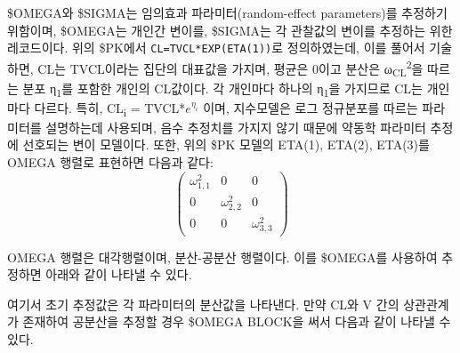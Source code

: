 \documentclass[
  10pt,
  krantz2,
  a4paper]{krantz}
\newenvironment{Shaded}{\begin{snugshade}}{\end{snugshade}}
\newcommand{\DecValTok}[1]{\textcolor[rgb]{0.00,0.00,0.81}{#1}}
\newcommand{\FloatTok}[1]{\textcolor[rgb]{0.00,0.00,0.81}{#1}}
\newcommand{\KeywordTok}[1]{\textcolor[rgb]{0.13,0.29,0.53}{\textbf{#1}}}
\newcommand{\NormalTok}[1]{#1}
\newcommand{\OperatorTok}[1]{\textcolor[rgb]{0.81,0.36,0.00}{\textbf{#1}}}
\newenvironment{Shaded}{\begin{snugshade}}{\end{snugshade}}
\theoremstyle{definition}
\theoremstyle{definition}
\theoremstyle{definition}
\theoremstyle{remark}
\begin{document}
\$OMEGA와 \$SIGMA는 임의효과 파라미터(random-effect parameters)를 추정하기 위함이며, \$OMEGA는 개인간 변이를, \$SIGMA는 각 관찰값의 변이를 추정하는 위한 레코드이다. 위의 \$PK에서 \texttt{CL=TVCL*EXP(ETA(1))}로 정의하였는데, 이를 풀어서 기술하면, CL는 TVCL이라는 집단의 대표값을 가지며, 평균은 0이고 분산은 ω\textsubscript{CL}\textsuperscript{2}을 따르는 분포 η\textsubscript{1}를 포함한 개인의 CL값이다. 각 개인마다 하나의 η\textsubscript{1}을 가지므로 CL는 개인마다 다르다. 특히, CL\textsubscript{i} = TVCL*\(e^{\eta_{i}}\) 이며, 지수모델은 로그 정규분포를 따르는 파라미터를 설명하는데 사용되며, 음수 추정치를 가지지 않기 때문에 약동학 파라미터 추정에 선호되는 변이 모델이다. 또한, 위의 \$PK 모델의 ETA(1), ETA(2), ETA(3)를 OMEGA 행렬로 표현하면 다음과 같다:
\begin{equation}
\begin{pmatrix} 
   \omega_{1,1}^2 & 0 & 0 \\
   0 & \omega_{2,2}^2 & 0 \\
   0 & 0 & \omega_{3,3}^2
\label{eq:iivomega}
\end{pmatrix}
\end{equation}

OMEGA 행렬은 대각행렬이며, 분산-공분산 행렬이다. 이를 \$OMEGA를 사용하여 추정하면 아래와 같이 나타낼 수 있다.

\begin{Shaded}
\end{Shaded}

여기서 초기 추정값은 각 파라미터의 분산값을 나타낸다. 만약 CL와 V 간의 상관관계가 존재하여 공분산을 추정할 경우 \$OMEGA BLOCK을 써서 다음과 같이 나타낼 수 있다.

\begin{Shaded}
\end{Shaded}
\end{document}

